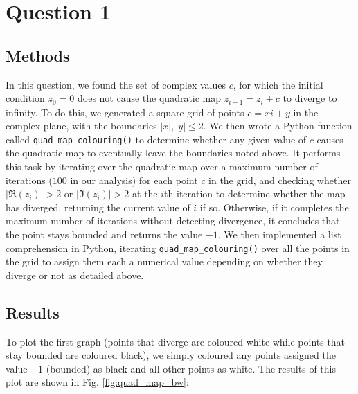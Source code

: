 \documentclass{article}
\begin{document}
\section*{Question 1}

\subsection*{Methods}
In this question, we found the set of complex values $c$, for which the initial condition $z_0 = 0$ does not cause the quadratic map $z_{i + 1} = z_i + c$ to diverge to infinity. To do this, we generated a square grid of points $c = xi + y$ in the complex plane, with the boundaries $|x|, |y| \leq 2$. We then wrote a Python function called \texttt{quad\_map\_colouring()} to determine whether any given value of $c$ causes the quadratic map to eventually leave the boundaries noted above. It performs this task by iterating over the quadratic map over a maximum number of iterations ($100$ in our analysis) for each point $c$ in the grid, and checking whether $|\mathfrak{R}(z_i)| > 2$ or $|\mathfrak{I}(z_i)| > 2$ at the $i$th iteration to determine whether the map has diverged, returning the current value of $i$ if so. Otherwise, if it completes the maximum number of iterations without detecting divergence, it concludes that the point stays bounded and returns the value $-1$. 
\smallbreak
We then implemented a list comprehension in Python, iterating \texttt{quad\_map\_colouring()} over all the points in the grid to assign them each a numerical value depending on whether they diverge or not as detailed above. 

\subsection*{Results}
To plot the first graph (points that diverge are coloured white while points that stay bounded are coloured black), we simply coloured any points assigned the value $-1$ (bounded) as black and all other points as white. The results of this plot are shown in Fig. \ref{fig:quad_map_bw}:
\end{document}
